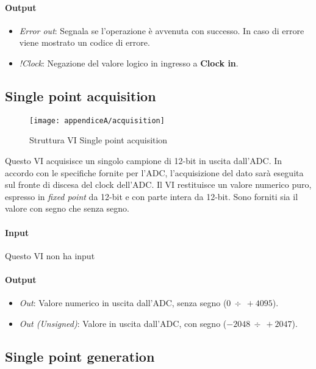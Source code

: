 \paragraph*{Output}
\begin{itemize}
	\item \textit{Error out}: Segnala se l'operazione è avvenuta con successo. In caso di errore viene mostrato un codice di errore.
	\item \textit{!Clock}: Negazione del valore logico in ingresso a \textbf{Clock in}.
\end{itemize}

\subsection*{Single point acquisition}

\begin{figure}[H]  
	\begin{center}
		\texttt{[image: appendiceA/acquisition]}
		\caption{Struttura VI Single point acquisition}
	\end{center}
\end{figure}

Questo VI acquisisce un singolo campione di 12-bit in uscita dall'ADC. In accordo con le specifiche fornite per l'ADC, l'acquisizione del dato sarà eseguita sul fronte di discesa del clock dell'ADC.
Il VI restituisce un valore numerico puro, espresso in \textit{fixed point} da 12-bit e con parte intera da 12-bit. Sono forniti sia il valore con segno che senza segno.

\paragraph*{Input}
Questo VI non ha input

\paragraph*{Output}
\begin{itemize}
	\item \textit{Out}: Valore numerico in uscita dall'ADC, senza segno ($0 \ \div \ +4095$).
	\item \textit{Out (Unsigned)}: Valore in uscita dall'ADC, con segno ($-2048 \ \div \ +2047$).
\end{itemize}

\subsection*{Single point generation}


